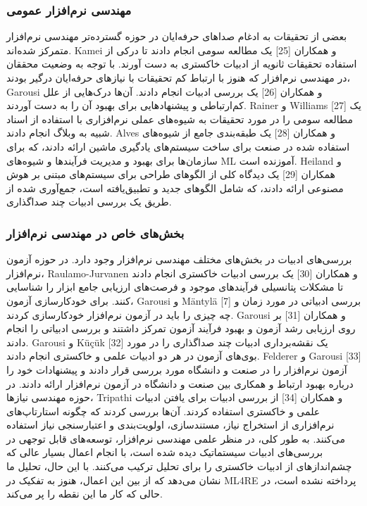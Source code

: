 \documentclass[a4paper,10pt]{article}
\begin{document}
            \subsubsection{مهندسی نرم‌افزار عمومی}

                بعضی از تحقیقات به ادغام صداهای حرفه‌ایان در حوزه گسترده‌تر مهندسی نرم‌افزار متمرکز شده‌اند. Kamei و همکاران [25] یک مطالعه سومی انجام دادند تا درکی از استفاده تحقیقات ثانویه از ادبیات خاکستری به دست آورند. با توجه به وضعیت محققان در مهندسی نرم‌افزار که هنوز با ارتباط کم تحقیقات با نیازهای حرفه‌ایان درگیر بودند، Garousi و همکاران [26] یک بررسی ادبیات انجام دادند. آن‌ها درک‌هایی از علل کم‌ارتباطی و پیشنهادهایی برای بهبود آن را به دست آوردند. Rainer و Williams [27] یک مطالعه سومی را در مورد تحقیقات به شیوه‌های عملی نرم‌افزاری با استفاده از اسناد شبیه به وبلاگ انجام دادند. Alves و همکاران [28] یک طبقه‌بندی جامع از شیوه‌های استفاده شده در صنعت برای ساخت سیستم‌های یادگیری ماشین ارائه دادند، که برای سازمان‌ها برای بهبود و مدیریت فرآیندها و شیوه‌های ML آموزنده است. Heiland و همکاران [29] یک دیدگاه کلی از الگوهای طراحی برای سیستم‌های مبتنی بر هوش مصنوعی ارائه دادند، که شامل الگوهای جدید و تطبیق‌یافته است، جمع‌آوری شده از طریق یک بررسی ادبیات چند صداگذاری.

            \subsubsection{بخش‌های خاص در مهندسی نرم‌افزار}

                بررسی‌های ادبیات در بخش‌های مختلف مهندسی نرم‌افزار وجود دارد. در حوزه آزمون نرم‌افزار، Raulamo-Jurvanen و همکاران [30] یک بررسی ادبیات خاکستری انجام دادند تا مشکلات پتانسیلی فرآیندهای موجود و فرصت‌های ارزیابی جامع ابزار را شناسایی کنند. برای خودکارسازی آزمون، Garousi و Mäntylä [7] بررسی ادبیاتی در مورد زمان و چه چیزی را باید در آزمون نرم‌افزار خودکارسازی کردند. Garousi و همکاران [31] بر روی ارزیابی رشد آزمون و بهبود فرآیند آزمون تمرکز داشتند و بررسی ادبیاتی را انجام دادند. Garousi و Küçük [32] یک نقشه‌برداری ادبیات چند صداگذاری را در مورد بوی‌های آزمون در هر دو ادبیات علمی و خاکستری انجام دادند. Felderer و Garousi [33] آزمون نرم‌افزار را در صنعت و دانشگاه مورد بررسی قرار دادند و پیشنهادات خود را درباره بهبود ارتباط و همکاری بین صنعت و دانشگاه در آزمون نرم‌افزار ارائه دادند. در حوزه مهندسی نیازها، Tripathi و همکاران [34] از بررسی ادبیات برای یافتن ادبیات علمی و خاکستری استفاده کردند. آن‌ها بررسی کردند که چگونه استارتاپ‌های نرم‌افزاری از استخراج نیاز، مستندسازی، اولویت‌بندی و اعتبارسنجی نیاز استفاده می‌کنند. به طور کلی، در منظر علمی مهندسی نرم‌افزار، توسعه‌های قابل توجهی در بررسی‌های ادبیات سیستماتیک دیده شده است، با انجام اعمال بسیار عالی که چشم‌اندازهای از ادبیات خاکستری را برای تحلیل ترکیب می‌کنند. با این حال، تحلیل ما نشان می‌دهد که از بین این اعمال، هنوز به تفکیک در ML4RE پرداخته نشده است، در حالی که کار ما این نقطه را پر می‌کند.
\end{document}
